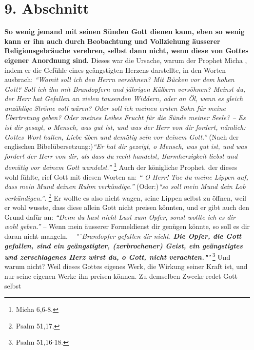 \section{9. Abschnitt} \label{kap6_ab9}

\label{ref:06_09_gottesregeln}
\textbf{So wenig jemand mit seinen Sünden Gott dienen kann, eben so wenig kann
er ihn
auch durch Beobachtung und Vollziehung äusserer Religionsgebräuche verehren,
selbst dann nicht, wenn diese von Gottes eigener Anordnung sind.}
Dieses war die
Ursache, warum der Prophet Micha , indem er die Gefühle
eines geängstigten
Herzens darstellte, in den Worten ausbrach:
\textit{"`Womit soll ich den Herrn versöhnen? Mit Bücken vor dem hohen Gott?
Soll ich ihn mit Brandopfern und jährigen Kälbern versöhnen? Meinst du, der
Herr hat Gefallen an vielen tausenden Widdern, oder an Öl, wenn es gleich
unzählige Ströme voll wären? Oder soll ich meinen ersten Sohn für meine
Übertretung geben? Oder meines Leibes Frucht für die Sünde meiner Seele? -- Es
ist dir gesagt, o Mensch, was gut ist, und was der Herr von dir fordert,
nämlich: Gottes Wort halten, Liebe üben und demütig sein vor deinem Gott."'}
(Nach der englischen Bibelübersetzung:)\textit{"`Er hat dir gezeigt,
o Mensch, was gut ist, und was fordert der Herr von dir, als dass du recht
handelst, Barmherzigkeit liebst und demütig vor deinem Gott
wandelst."'}
\footnote{Micha 6,6-8.}
Auch der königliche Prophet, der dieses
wohl fühlte, rief Gott mit diesen Worten an:
\textit{"` O Herr! Tue du meine Lippen auf,
dass mein Mund deinen Ruhm verkündige."'} (Oder:)\textit{"`so soll mein Mund
dein Lob
verkündigen."'}.
\footnote{Psalm 51,17.}
Er wollte es also nicht wagen,
seine Lippen selbst zu öffnen, weil er wohl wusste, dass diese allein Gott
nicht preisen könnten, und er gibt auch den Grund dafür an:
\textit{"`Denn du hast
nicht Lust zum Opfer, sonst wollte ich es dir wohl geben."'} -- Wenn mein
äusserer Formeldienst dir genügen könnte, so soll es dir daran nicht mangeln.
--
\textit{"`Brandopfer  gefallen dir nicht. \textbf{Die Opfer,
die Gott gefallen, sind ein geängstigter, (zerbrochener) Geist, ein
geängstigtes und zerschlagenes Herz wirst du, o Gott, nicht verachten."'}}
\footnote{Psalm 51,16-18.}
Und warum
nicht? Weil dieses Gottes eigenes Werk, die Wirkung seiner Kraft ist, und nur
seine eigenen Werke ihn preisen können. Zu demselben Zwecke redet Gott selbst
